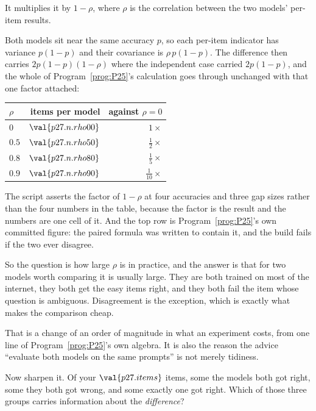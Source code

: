 \begin{fr}
\begin{ansblock}
It multiplies it by $1 - \rho$, where $\rho$ is the correlation between the
two models' per-item results.
\end{ansblock}

Both models sit near the same accuracy $p$, so each per-item indicator has
variance $p(1-p)$ and their covariance is $\rho\,p(1-p)$. The difference then
carries $2p(1-p)(1-\rho)$ where the independent case carried $2p(1-p)$, and
the whole of Program~\ref{prog:P25}'s calculation goes through unchanged with
that one factor attached:

\begin{center}
\begin{tabular}{lrr}
\toprule
$\rho$ & items per model & against $\rho = 0$ \\
\midrule
$0$ & $\val{p27.n.rho00}$ & $1\times$ \\
$\num{0.5}$ & $\val{p27.n.rho50}$ & $\tfrac{1}{2}\times$ \\
$\num{0.8}$ & $\val{p27.n.rho80}$ & $\tfrac{1}{5}\times$ \\
$\num{0.9}$ & $\val{p27.n.rho90}$ & $\tfrac{1}{10}\times$ \\
\bottomrule
\end{tabular}
\end{center}

The script asserts the factor of $1-\rho$ at four accuracies and three gap
sizes rather than the four numbers in the table, because the factor is the
result and the numbers are one cell of it. And the top row is
Program~\ref{prog:P25}'s own committed figure: the paired formula was written
to contain it, and the build fails if the two ever disagree.
\end{fr}

\begin{fr}
So the question is how large $\rho$ is in practice, and the answer is that
for two models worth comparing it is usually large. They are both trained on
most of the internet, they both get the easy items right, and they both fail
the item whose question is ambiguous. Disagreement is the exception, which is
exactly what makes the comparison cheap.


That is a change of an order of magnitude in what an experiment costs, from
one line of Program~\ref{prog:P25}'s own algebra. It is also the reason the
advice \enquote{evaluate both models on the same prompts} is not merely
tidiness.

Now sharpen it. Of your $\val{p27.items}$ items, some the models both got
right, some they both got wrong, and some exactly one got right. Which of
those three groups carries information about the \emph{difference}?
\dotline
\nextframe
\end{fr}

